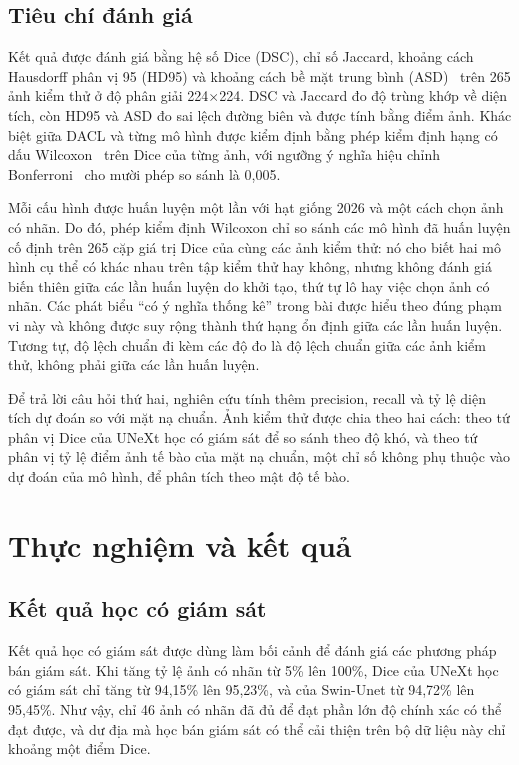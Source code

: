 \documentclass{IEEEtran}
\begin{document}
\subsection{Tiêu chí đánh giá}

Kết quả được đánh giá bằng hệ số Dice (DSC), chỉ số Jaccard, khoảng cách Hausdorff phân vị 95 (HD95) và khoảng cách bề mặt trung bình (ASD)~\cite{metrics} trên 265 ảnh kiểm thử ở độ phân giải 224$\times$224. DSC và Jaccard đo độ trùng khớp về diện tích, còn HD95 và ASD đo sai lệch đường biên và được tính bằng điểm ảnh. Khác biệt giữa DACL và từng mô hình được kiểm định bằng phép kiểm định hạng có dấu Wilcoxon~\cite{wilcoxon} trên Dice của từng ảnh, với ngưỡng ý nghĩa hiệu chỉnh Bonferroni~\cite{bonferroni} cho mười phép so sánh là 0,005.

Mỗi cấu hình được huấn luyện một lần với hạt giống 2026 và một cách chọn ảnh có nhãn. Do đó, phép kiểm định Wilcoxon chỉ so sánh các mô hình đã huấn luyện cố định trên 265 cặp giá trị Dice của cùng các ảnh kiểm thử: nó cho biết hai mô hình cụ thể có khác nhau trên tập kiểm thử hay không, nhưng không đánh giá biến thiên giữa các lần huấn luyện do khởi tạo, thứ tự lô hay việc chọn ảnh có nhãn. Các phát biểu ``có ý nghĩa thống kê'' trong bài được hiểu theo đúng phạm vi này và không được suy rộng thành thứ hạng ổn định giữa các lần huấn luyện. Tương tự, độ lệch chuẩn đi kèm các độ đo là độ lệch chuẩn giữa các ảnh kiểm thử, không phải giữa các lần huấn luyện.

Để trả lời câu hỏi thứ hai, nghiên cứu tính thêm precision, recall và tỷ lệ diện tích dự đoán so với mặt nạ chuẩn. Ảnh kiểm thử được chia theo hai cách: theo tứ phân vị Dice của UNeXt học có giám sát để so sánh theo độ khó, và theo tứ phân vị tỷ lệ điểm ảnh tế bào của mặt nạ chuẩn, một chỉ số không phụ thuộc vào dự đoán của mô hình, để phân tích theo mật độ tế bào.

\section{Thực nghiệm và kết quả}
\label{sec:results}

\subsection{Kết quả học có giám sát}

Kết quả học có giám sát được dùng làm bối cảnh để đánh giá các phương pháp bán giám sát. Khi tăng tỷ lệ ảnh có nhãn từ 5\% lên 100\%, Dice của UNeXt học có giám sát chỉ tăng từ 94,15\% lên 95,23\%, và của Swin-Unet từ 94,72\% lên 95,45\%. Như vậy, chỉ 46 ảnh có nhãn đã đủ để đạt phần lớn độ chính xác có thể đạt được, và dư địa mà học bán giám sát có thể cải thiện trên bộ dữ liệu này chỉ khoảng một điểm Dice.
\end{document}
